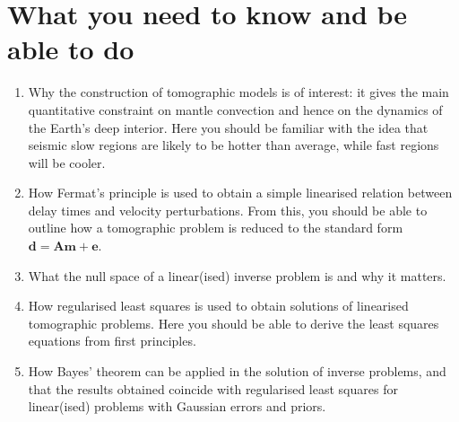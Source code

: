 \section*{What you need to know and be able to do}
\begin{enumerate}
    \item[(i)] Why the construction of tomographic models is of interest: it gives the main quantitative 
    constraint on mantle convection and hence on the dynamics of the Earth's deep interior. Here you should 
    be familiar with the idea that seismic slow regions are likely to be hotter than average, while fast 
    regions will be cooler.
    \item[(ii)] How Fermat's principle is used to obtain a simple linearised relation between delay times 
    and velocity perturbations. From this, you should be able to outline how a tomographic problem is reduced 
    to the standard form $\mathbf{d} = \mathbf{A}\mathbf{m} + \mathbf{e}$.
    \item[(iii)] What the null space of a linear(ised) inverse problem is and why it matters.
    \item[(iv)] How regularised least squares is used to obtain solutions of linearised tomographic problems. 
    Here you should be able to derive the least squares equations from first principles.
    \item[(v)] How Bayes' theorem can be applied in the solution of inverse problems, and that the 
    results obtained coincide with regularised least squares for linear(ised) problems with Gaussian errors and priors.
\end{enumerate}
